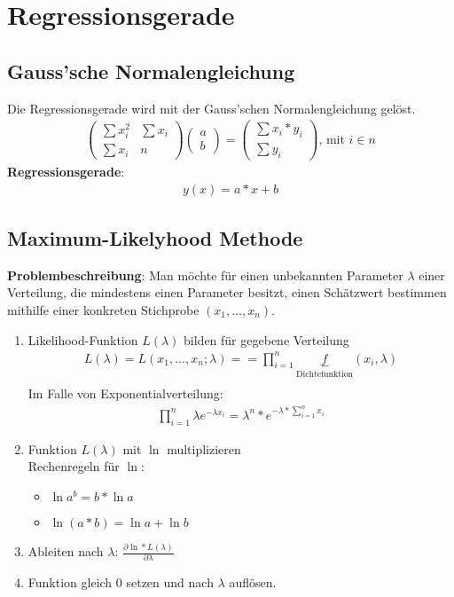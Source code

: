 \documentclass{article}
\begin{document}
	\section{Regressionsgerade}
	\subsection{Gauss'sche Normalengleichung}
	Die Regressionsgerade wird mit der Gauss'schen Normalengleichung gelöst.
	\begin{align}
	\begin{pmatrix}
	\sum x_i^2 & \sum x_i \\
	\sum x_i   & n
	\end{pmatrix}
	\begin{pmatrix}
	a \\
	b
	\end{pmatrix}
	=
	\begin{pmatrix}
	\sum x_i*y_i \\
	\sum y_i
	\end{pmatrix} \text{, mit $i \in n$}
	\end{align}
	\textbf{Regressionsgerade}:
	\begin{align}
	y(x) = a*x + b
	\end{align}
	
	\subsection{Maximum-Likelyhood Methode}
	\textbf{Problembeschreibung}: Man möchte für einen unbekannten Parameter $\lambda$
	einer Verteilung, die mindestens einen Parameter besitzt, einen Schätzwert bestimmen
	mithilfe einer konkreten Stichprobe $(x_1, \ldots, x_n)$.
	
	\begin{enumerate}
		\item Likelihood-Funktion $L(\lambda)$ bilden für gegebene Verteilung
		\begin{align}
		L(\lambda) = L(x_1, \ldots, x_n; \lambda) = = \prod_{i=1}^n
		\underbrace{f}_{\text{Dichtefunktion}}(x_i, \lambda)\\
		\end{align}
		Im Falle von Exponentialverteilung:\\
		\begin{align}
		\prod_{i=1}^n \lambda e^{-\lambda x_i} = \lambda^n * e^{-\lambda * \sum_{i=1}^{n}x_i}
		\end{align}
		\item Funktion $L(\lambda)$ mit $\ln$ multiplizieren\\
		Rechenregeln für $\ln$:
		\begin{itemize}
			\item $\ln a^b = b * \ln a$
			\item $\ln (a*b) = \ln a + \ln b$
		\end{itemize}
		\item Ableiten nach $\lambda$: $\frac{\partial \ln * L(\lambda)}{\partial \lambda}$
		\item Funktion gleich $0$ setzen und nach $\lambda$ auflösen.
	\end{enumerate}
	
\end{document}
